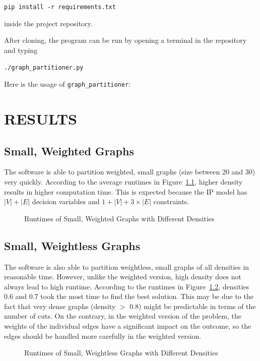 \documentclass[a4paper,12pt]{report}
\begin{document}
\noindent \texttt{pip install -r requirements.txt}

\noindent inside the project repository.

After cloning, the program can be run by opening a terminal in the repository and typing

\texttt{./graph\_partitioner.py}

\noindent Here is the usage of \texttt{graph\_partitioner}:




\chapter{RESULTS}
\label{sec:results}


\section{Small, Weighted Graphs}

The software is able to partition weighted, small graphs (size between 20 and 30) very quickly. According to the average runtimes in Figure~\ref{fig:p1}, higher density results in higher computation time. This is expected because the IP model has \( |V| + |E| \) decision variables and \( 1 + |V| + 3 \times |E| \) constraints.

\begin{figure}[ht]
	\centering
	
	\caption{Runtimes of Small, Weighted Graphs with Different Densities}
	\label{fig:p1}
\end{figure}

\section{Small, Weightless Graphs}

The software is also able to partition weightless, small graphs of all densities in reasonable time. However, unlike the weighted version, high density does not always lead to high runtime. According to the runtimes in Figure~\ref{fig:p2}, densities 0.6 and 0.7 took the most time to find the best solution. This may be due to the fact that very dense graphs (density \(>\) 0.8) might be predictable in terms of the number of cuts. On the contrary, in the weighted version of the problem, the weights of the individual edges have a significant impact on the outcome, so the edges should be handled more carefully in the weighted version.

\begin{figure}[ht]
	\centering
	
	\caption{Runtimes of Small, Weightless Graphs with Different Densities}
	\label{fig:p2}
\end{figure}
\end{document}
